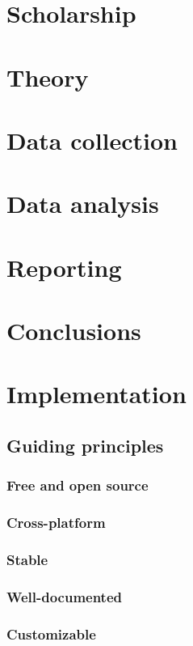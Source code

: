 \documentclass{book}
\begin{document}
\chapter{Scholarship}
\label{sec-4}
\label{scholarship}
\chapter{Theory}
\label{sec-5}
\label{theory}
\chapter{Data collection}
\label{sec-6}
\label{collection}
\chapter{Data analysis}
\label{sec-7}
\label{analysis}
\chapter{Reporting}
\label{sec-8}
\label{reporting}
\chapter{Conclusions}
\label{sec-9}
\label{conclusions}
\chapter{Implementation}
\label{sec-10}
\section{Guiding principles}
\label{sec-10-1}
\subsection{Free and open source}
\label{sec-10-1-1}
\subsection{Cross-platform}
\label{sec-10-1-2}
\subsection{Stable}
\label{sec-10-1-3}
\subsection{Well-documented}
\label{sec-10-1-4}
\subsection{Customizable}
\label{sec-10-1-5}
\end{document}
